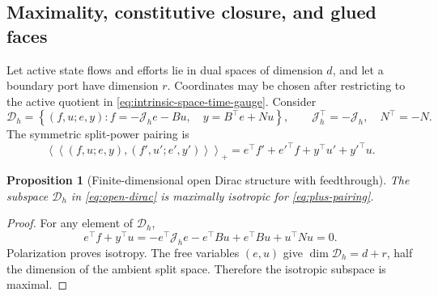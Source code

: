 \documentclass[11pt,a4paper]{article}
\newtheorem{proposition}[theorem]{Proposition}
\newcommand{\cD}{\mathcal D}
\begin{document}
\subsection{Maximality, constitutive closure, and glued faces}

Let active state flows and efforts lie in dual spaces of dimension \(d\),
and let a boundary port have dimension \(r\).  Coordinates may be chosen
after restricting to the active quotient in
\cref{eq:intrinsic-space-time-gauge}.  Consider
\begin{equation}\label{eq:open-dirac}
 \cD_h=\left\{(f,u;e,y):
 f=-\mathcal J_he-Bu,\quad y=B^\top e+Nu\right\},
 \qquad \mathcal J_h^\top=-\mathcal J_h,\quad N^\top=-N.
\end{equation}
The symmetric split-power pairing is
\begin{equation}\label{eq:plus-pairing}
 \left\langle\!\left\langle
 (f,u;e,y),(f',u';e',y')
 \right\rangle\!\right\rangle_+
 =e^\top f'+e'^\top f+y^\top u'+y'^\top u.
\end{equation}

\begin{proposition}[Finite-dimensional open Dirac structure with feedthrough]
\label{prop:dirac-maximal}
The subspace \(\cD_h\) in \cref{eq:open-dirac} is maximally isotropic for
\cref{eq:plus-pairing}.
\end{proposition}

\begin{proof}
For any element of \(\cD_h\),
\[
 e^\top f+y^\top u
 =-e^\top\mathcal J_he-e^\top Bu+e^\top Bu+u^\top Nu=0.
\]
Polarization proves isotropy. The free variables \((e,u)\) give
\(\dim\cD_h=d+r\), half the dimension of the ambient split space.
Therefore the isotropic subspace is maximal.
\end{proof}
\end{document}
